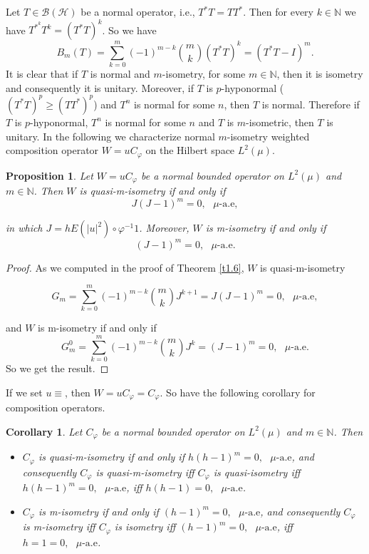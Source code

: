 \documentclass{amsart}
\newtheorem{cor}[thm]{Corollary}
\newtheorem{prop}[thm]{Proposition}
\theoremstyle{definition}\newtheorem{defn}[thm]{Definition}
\theoremstyle{remark}
\numberwithin{equation}{section}
\begin{document}
Let $T\in \mathcal{B}(\mathcal{H})$ be a normal operator, i.e., $T^*T=TT^*$. Then for every $k\in \mathbb{N}$ we have $T^{*^k}T^k=(T^*T)^k$.
So we have 
$$B_m(T)=\sum_{k=0}^{m}(-1)^{m-k}\binom{m}{k}(T^*T)^{k}=(T^*T-I)^m.$$
It is clear that if $T$ is normal and $m$-isometry, for some $m\in \mathbb{N}$, then it is isometry and consequently it is unitary. Moreover, if $T$ is $p$-hyponormal ($(T^*T)^p\geq(TT^*)^p$) and $T^n$ is normal for some $n$, then $T$ is normal. Therefore if $T$ is $p$-hyponormal, $T^n$ is normal for some $n$ and $T$ is $m$-isometric, then $T$ is unitary. In the following we characterize normal $m$-isometry weighted composition operator $W=uC_{\varphi}$ on the Hilbert space $L^2(\mu)$.

\begin{prop}
Let $W=uC_{\varphi}$ be a normal bounded operator on $L^2(\mu)$ and $m\in \mathbb{N}$. Then $W$ is quasi-m-isometry if and only if
$$J(J-1)^m=0,\ \ \ \text{$\mu$-a.e},$$

in which $J=hE(|u|^2)\circ\varphi^{-1}1$.
Moreover, $W$ is m-isometry if and only if 
$$(J-1)^m=0, \ \ \ \text{$\mu$-a.e}.$$
\end{prop}
\begin{proof} As we computed in the proof of Theorem \ref{t1.6}, $W$ is quasi-m-isometry

$$G_m=\sum_{k=0}^{m}(-1)^{m-k}\binom{m}{k}J^{k+1}=J(J-1)^m=0,\ \ \ \text{$\mu$-a.e},$$

and $W$ is m-isometry if and only if 
$$G^0_m=\sum_{k=0}^{m}(-1)^{m-k}\binom{m}{k}J^{k}=(J-1)^m=0, \ \ \ \text{$\mu$-a.e}.$$
So we get the result.
\end{proof}
If we set $u\equiv $, then $W=uC_{\varphi}=C_{\varphi}$. So have the following corollary for composition operators.
\begin{cor}
Let $C_{\varphi}$ be a normal bounded operator on $L^2(\mu)$ and $m\in \mathbb{N}$. Then\\
\begin{itemize}
  \item  $C_{\varphi}$ is quasi-m-isometry if and only if
$h(h-1)^m=0,\ \ \ \text{$\mu$-a.e}$,
and consequently $C_{\varphi}$ is quasi-m-isometry iff $C_{\varphi}$ is quasi-isometry iff 
$h(h-1)^m=0,\ \ \ \text{$\mu$-a.e}$, 
iff
$h(h-1)=0,\ \ \ \text{$\mu$-a.e}$.
\item  $C_{\varphi}$ is m-isometry if and only if 
$(h-1)^m=0, \ \ \ \text{$\mu$-a.e}$,
and consequently $C_{\varphi}$ is m-isometry iff $C_{\varphi}$ is isometry iff
$(h-1)^m=0, \ \ \ \text{$\mu$-a.e}$, iff $h=1=0, \ \ \ \text{$\mu$-a.e}$.
\end{itemize}
\end{cor}
\end{document}
